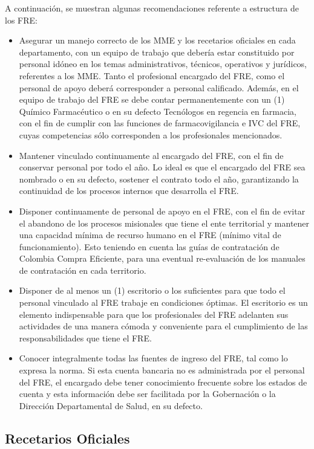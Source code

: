 \documentclass[
]{book}
\begin{document}
A continuación, se muestran algunas recomendaciones referente a estructura de los FRE:

\begin{itemize}
\item
  Asegurar un manejo correcto de los MME y los recetarios oficiales en cada departamento, con un equipo de trabajo que debería estar constituido por personal idóneo en los temas administrativos, técnicos, operativos y jurídicos, referentes a los MME. Tanto el profesional encargado del FRE, como el personal de apoyo deberá corresponder a personal calificado. Además, en el equipo de trabajo del FRE se debe contar permanentemente con un (1) Químico Farmacéutico o en su defecto Tecnólogos en regencia en farmacia, con el fin de cumplir con las funciones de farmacovigilancia e IVC del FRE, cuyas competencias sólo corresponden a los profesionales mencionados.
\item
  Mantener vinculado continuamente al encargado del FRE, con el fin de conservar personal por todo el año. Lo ideal es que el encargado del FRE sea nombrado o en su defecto, sostener el contrato todo el año, garantizando la continuidad de los procesos internos que desarrolla el FRE.
\item
  Disponer continuamente de personal de apoyo en el FRE, con el fin de evitar el abandono de los procesos misionales que tiene el ente territorial y mantener una capacidad mínima de recurso humano en el FRE (mínimo vital de funcionamiento). Esto teniendo en cuenta las guías de contratación de Colombia Compra Eficiente, para una eventual re-evaluación de los manuales de contratación en cada territorio.
\item
  Disponer de al menos un (1) escritorio o los suficientes para que todo el personal vinculado al FRE trabaje en condiciones óptimas. El escritorio es un elemento indispensable para que los profesionales del FRE adelanten sus actividades de una manera cómoda y conveniente para el cumplimiento de las responsabilidades que tiene el FRE.
\item
  Conocer integralmente todas las fuentes de ingreso del FRE, tal como lo expresa la norma. Si esta cuenta bancaria no es administrada por el personal del FRE, el encargado debe tener conocimiento frecuente sobre los estados de cuenta y esta información debe ser facilitada por la Gobernación o la Dirección Departamental de Salud, en su defecto.
\end{itemize}

\hypertarget{recetarios-oficiales-1}{%
\subsection{Recetarios Oficiales}\label{recetarios-oficiales-1}}
\end{document}

